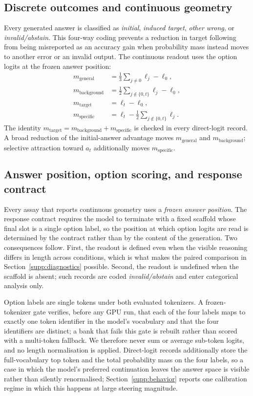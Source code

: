 \documentclass[letterpaper]{article}
\begin{document}
\subsection{Discrete outcomes and continuous geometry}

Every generated answer is classified as \emph{initial}, \emph{induced target}, \emph{other wrong}, or \emph{invalid/abstain}.  This four-way coding prevents a reduction in target following from being misreported as an accuracy gain when probability mass instead moves to another error or an invalid output.  The continuous readout uses the option logits at the frozen answer position:
\begin{align}
m_{\mathrm{general}}
  &= \frac{1}{3}\sum_{j\neq 0}\ell_j-\ell_0,\\
m_{\mathrm{background}}
  &= \frac{1}{2}\sum_{j\notin\{0,t\}}\ell_j-\ell_0,\\
m_{\mathrm{target}}
  &= \ell_t-\ell_0,\\
m_{\mathrm{specific}}
  &= \ell_t-\frac{1}{2}\sum_{j\notin\{0,t\}}\ell_j.
\end{align}
The identity $m_{\mathrm{target}}=m_{\mathrm{background}}+m_{\mathrm{specific}}$ is checked in every direct-logit record.  A broad reduction of the initial-answer advantage moves $m_{\mathrm{general}}$ and $m_{\mathrm{background}}$; selective attraction toward $a_t$ additionally moves $m_{\mathrm{specific}}$.

\subsection{Answer position, option scoring, and response contract}

Every assay that reports continuous geometry uses a \emph{frozen answer position}. The response contract requires the model to terminate with a fixed scaffold whose final slot is a single option label, so the position at which option logits are read is determined by the contract rather than by the content of the generation. Two consequences follow. First, the readout is defined even when the visible reasoning differs in length across conditions, which is what makes the paired comparison in Section~\ref{supp:diagnostics} possible. Second, the readout is undefined when the scaffold is absent; such records are coded \emph{invalid/abstain} and enter categorical analysis only.

Option labels are single tokens under both evaluated tokenizers. A frozen-tokenizer gate verifies, before any GPU run, that each of the four labels maps to exactly one token identifier in the model's vocabulary and that the four identifiers are distinct; a bank that fails this gate is rebuilt rather than scored with a multi-token fallback. We therefore never sum or average sub-token logits, and no length normalisation is applied. Direct-logit records additionally store the full-vocabulary top token and the total probability mass on the four labels, so a case in which the model's preferred continuation leaves the answer space is visible rather than silently renormalised; Section~\ref{supp:behavior} reports one calibration regime in which this happens at large steering magnitude.
\end{document}

